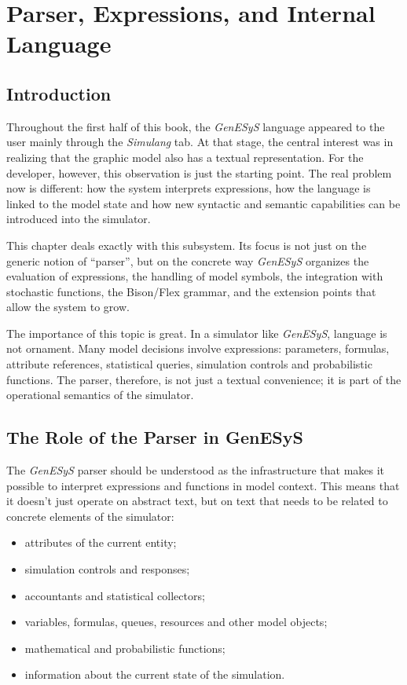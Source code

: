 \chapter{Parser, Expressions, and Internal Language}
\label{chap:parser_expressoes_linguagem_interna}

\section{Introduction}
\label{sec:cap9_introducao}

Throughout the first half of this book, the \textit{GenESyS} language appeared to the user mainly through the \textit{Simulang} tab. At that stage, the central interest was in realizing that the graphic model also has a textual representation. For the developer, however, this observation is just the starting point. The real problem now is different: how the system interprets expressions, how the language is linked to the model state and how new syntactic and semantic capabilities can be introduced into the simulator.

This chapter deals exactly with this subsystem. Its focus is not just on the generic notion of ``parser'', but on the concrete way \textit{GenESyS} organizes the evaluation of expressions, the handling of model symbols, the integration with stochastic functions, the Bison/Flex grammar, and the extension points that allow the system to grow.

The importance of this topic is great. In a simulator like \textit{GenESyS}, language is not ornament. Many model decisions involve expressions: parameters, formulas, attribute references, statistical queries, simulation controls and probabilistic functions. The parser, therefore, is not just a textual convenience; it is part of the operational semantics of the simulator.

\section{The Role of the Parser in GenESyS}
\label{sec:cap9_papel_parser_genesys}

The \textit{GenESyS} parser should be understood as the infrastructure that makes it possible to interpret expressions and functions in model context. This means that it doesn't just operate on abstract text, but on text that needs to be related to concrete elements of the simulator:
\begin{itemize}
 \item attributes of the current entity;
 \item simulation controls and responses;
 \item accountants and statistical collectors;
 \item variables, formulas, queues, resources and other model objects;
 \item mathematical and probabilistic functions;
 \item information about the current state of the simulation.
\end{itemize}

